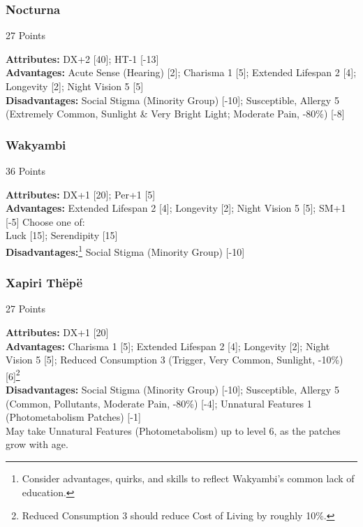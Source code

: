 \begin{multicols*}{3}
	\subsubsection*{Nocturna}
	\begin{flushright}
		27 Points
	\end{flushright}
	\textbf{Attributes:} 
	DX+2 [40]; HT-1 [-13]
	\\\textbf{Advantages:} 
	Acute Sense (Hearing) [2]; Charisma 1 [5]; Extended Lifespan 2 [4]; Longevity [2]; Night Vision 5 [5]
	\\\textbf{Disadvantages:} 
	Social Stigma (Minority Group) [-10]; Susceptible, Allergy 5 (Extremely Common, Sunlight \& Very Bright Light; Moderate Pain, -80\%) [-8]
	
	\subsubsection*{Wakyambi}
	\begin{flushright}
		36 Points
	\end{flushright}
	\textbf{Attributes:} 
	DX+1 [20]; Per+1 [5]
	\\\textbf{Advantages:} 
	Extended Lifespan 2 [4]; Longevity [2]; Night Vision 5 [5]; SM+1 [-5]
	Choose one of: \\
	Luck [15]; Serendipity [15]
	\\\textbf{Disadvantages:}\footnote{Consider advantages, quirks, and skills to reflect Wakyambi's common lack of education.}
	Social Stigma (Minority Group) [-10]
	
	\subsubsection*{Xapiri Thëpë}
	\begin{flushright}
		27 Points
	\end{flushright}
	\textbf{Attributes:} 
	DX+1 [20]
	\\\textbf{Advantages:} 
	Charisma 1 [5]; Extended Lifespan 2 [4]; Longevity [2]; Night Vision 5 [5]; Reduced Consumption 3 (Trigger, Very Common, Sunlight, -10\%)[6]\footnote{Reduced Consumption 3 should reduce Cost of Living by roughly 10\%.}
	\\\textbf{Disadvantages:} 
	Social Stigma (Minority Group) [-10]; Susceptible, Allergy 5 (Common, Pollutants, Moderate Pain, -80\%) [-4]; Unnatural Features 1 (Photometabolism Patches) [-1]
	\\ May take Unnatural Features (Photometabolism) up to level 6, as the patches grow with age.
	

\end{multicols*}
